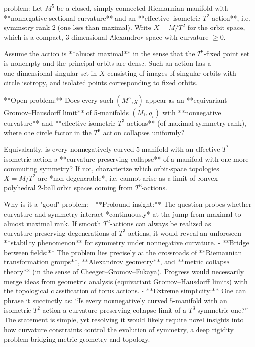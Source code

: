 problem:  
Let \( M^5 \) be a closed, simply connected Riemannian manifold with **nonnegative sectional curvature** and an **effective, isometric \(T^2\)-action**, i.e. symmetry rank \(2\) (one less than maximal).  Write \( X = M/T^2 \) for the orbit space, which is a compact, 3‑dimensional Alexandrov space with curvature \(\ge0\).  

Assume the action is **almost maximal** in the sense that the \(T^2\)-fixed point set is nonempty and the principal orbits are dense.  Such an action has a one‑dimensional singular set in \(X\) consisting of images of singular orbits with circle isotropy, and isolated points corresponding to fixed orbits.  

**Open problem:**  
Does every such \( (M^5, g) \) appear as an **equivariant Gromov–Hausdorff limit** of 5‑manifolds \( (M_i, g_i) \) with **nonnegative curvature** and **effective isometric \(T^3\)-actions** (of maximal symmetry rank), where one circle factor in the \(T^3\) action collapses uniformly?  

Equivalently, is every nonnegatively curved \(5\)-manifold with an effective \(T^2\)-isometric action a **curvature‑preserving collapse** of a manifold with one more commuting symmetry?  
If not, characterize which orbit‑space topologies \(X=M/T^2\) are *non‑degenerable*, i.e. cannot arise as a limit of convex polyhedral \(2\)-ball orbit spaces coming from \(T^3\)-actions.  

Why is it a "good" problem:  
- **Profound insight:** The question probes whether curvature and symmetry interact *continuously* at the jump from maximal to almost maximal rank.  If smooth \(T^2\)-actions can always be realized as curvature‑preserving degenerations of \(T^3\)-actions, it would reveal an unforeseen **stability phenomenon** for symmetry under nonnegative curvature.  
- **Bridge between fields:** The problem lies precisely at the crossroads of **Riemannian transformation groups**, **Alexandrov geometry**, and **metric collapse theory** (in the sense of Cheeger–Gromov–Fukaya).  Progress would necessarily merge ideas from geometric analysis (equivariant Gromov–Hausdorff limits) with the topological classification of torus actions.  
- **Extreme simplicity:**  One can phrase it succinctly as:  
  “Is every nonnegatively curved \(5\)-manifold with an isometric \(T^2\)-action a curvature‑preserving collapse limit of a \(T^3\)-symmetric one?”  
  The statement is simple, yet resolving it would likely require novel insights into how curvature constraints control the evolution of symmetry, a deep rigidity problem bridging metric geometry and topology.